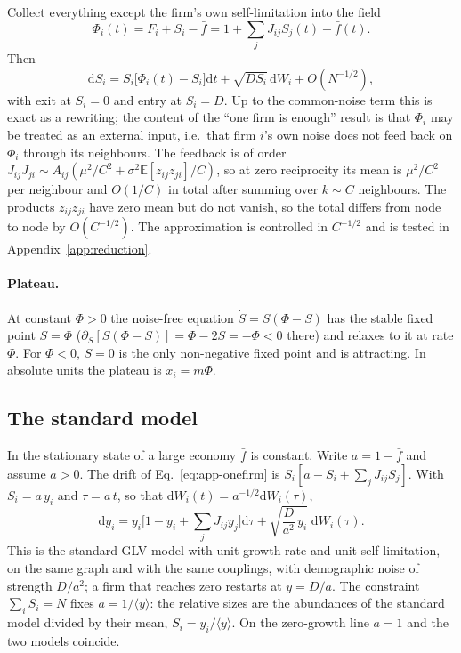 \documentclass[pre,twocolumn,superscriptaddress,nofootinbib]{revtex4-2}
\newcommand{\E}{\mathbb E}
\newcommand{\fb}{\bar f}
\newcommand{\dd}{\mathrm d}
\begin{document}
Collect everything except the firm's own self-limitation into the field
\begin{equation}
\Phi_i(t)=F_i+S_i-\fb=1+\sum_jJ_{ij}S_j(t)-\fb(t).
\label{eq:app-field}
\end{equation}
Then
\begin{equation}
\boxed{\dd S_i=S_i\big[\Phi_i(t)-S_i\big]\dd t+\sqrt{DS_i}\,\dd W_i+O(N^{-1/2}),}
\label{eq:app-onefirm}
\end{equation}
with exit at $S_i=0$ and entry at $S_i=D$.  Up to the common-noise term this is exact as a rewriting; the content of the
``one firm is enough'' result is that $\Phi_i$ may be treated as an external input, i.e.\ that firm $i$'s own
noise does not feed back on $\Phi_i$ through its neighbours.  The feedback is of order
$J_{ij}J_{ji}\sim A_{ij}(\mu^2/C^2+\sigma^2\E[z_{ij}z_{ji}]/C)$, so at zero reciprocity its mean is $\mu^2/C^2$ per
neighbour and $O(1/C)$ in total after summing over $k\sim C$ neighbours.  The products $z_{ij}z_{ji}$ have zero mean but do
not vanish, so the total differs from node to node by $O(C^{-1/2})$.  The approximation is controlled in $C^{-1/2}$ and is tested in Appendix~\ref{app:reduction}.

\paragraph{Plateau.}  At constant $\Phi>0$ the noise-free equation $\dot S=S(\Phi-S)$ has the stable fixed
point $S=\Phi$ ($\partial_S[S(\Phi-S)]=\Phi-2S=-\Phi<0$ there) and relaxes to it at rate $\Phi$.  For
$\Phi<0$, $S=0$ is the only non-negative fixed point and is attracting.  In absolute units the plateau is
$x_i=m\Phi$.

\subsection{The standard model}

In the stationary state of a large economy $\fb$ is constant.  Write $a=1-\fb$ and assume $a>0$.  The drift
of Eq.~\eqref{eq:app-onefirm} is $S_i[a-S_i+\sum_jJ_{ij}S_j]$.  With $S_i=a\,y_i$ and $\tau=a\,t$, so that
$\dd W_i(t)=a^{-1/2}\dd W_i(\tau)$,
\begin{equation}
\dd y_i=y_i\Big[1-y_i+\sum_jJ_{ij}y_j\Big]\dd\tau+\sqrt{\frac{D}{a^2}\,y_i}\;\dd W_i(\tau) .
\end{equation}
This is the standard GLV model with unit growth rate and unit self-limitation, on the same graph and with
the same couplings, with demographic noise of strength $D/a^2$; a firm that reaches zero restarts at
$y=D/a$.  The constraint $\sum_iS_i=N$ fixes $a=1/\langle y\rangle$: the relative sizes are the abundances
of the standard model divided by their mean, $S_i=y_i/\langle y\rangle$.  On the zero-growth line $a=1$
and the two models coincide.
\end{document}
